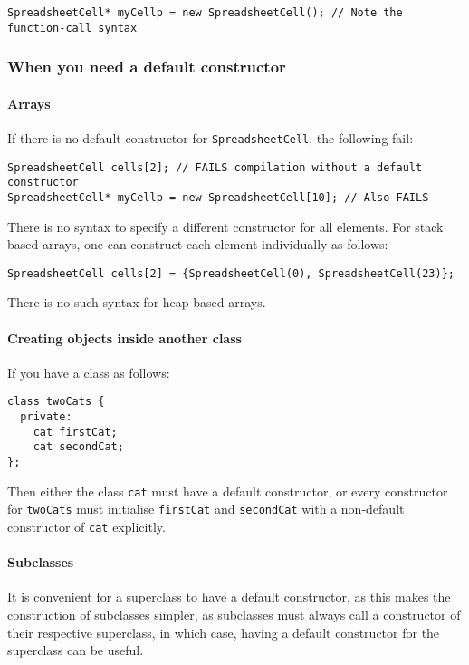 \documentclass[a4paper,12pt,oneside]{book}
\begin{document}
\begin{lstlisting}
SpreadsheetCell* myCellp = new SpreadsheetCell(); // Note the function-call syntax
\end{lstlisting}

\subsubsection{When you need a default constructor}
\paragraph{Arrays}
If there is no default constructor for \lstinline|SpreadsheetCell|, the following fail:

\begin{lstlisting}
SpreadsheetCell cells[2]; // FAILS compilation without a default constructor
SpreadsheetCell* myCellp = new SpreadsheetCell[10]; // Also FAILS
\end{lstlisting}

There is no syntax to specify a different constructor for all elements. For stack based arrays, one can construct each element individually as follows:

\begin{lstlisting}[caption={Example of \emph{initialisers}}]
SpreadsheetCell cells[2] = {SpreadsheetCell(0), SpreadsheetCell(23)};
\end{lstlisting}

There is no such syntax for heap based arrays.

\paragraph{Creating objects inside another class}
If you have a class as follows:

\begin{lstlisting}
class twoCats {
  private:
    cat firstCat;
    cat secondCat;
};
\end{lstlisting}
Then either the class \lstinline|cat| must have a default constructor, or every constructor for \lstinline|twoCats| must initialise \lstinline|firstCat| and \lstinline|secondCat| with a non-default constructor of \lstinline|cat| explicitly.

\paragraph{Subclasses}
It is convenient for a superclass to have a default constructor, as this makes the construction of subclasses simpler, as subclasses must always call a constructor of their respective superclass, in which case, having a default constructor for the superclass can be useful.
\end{document}
